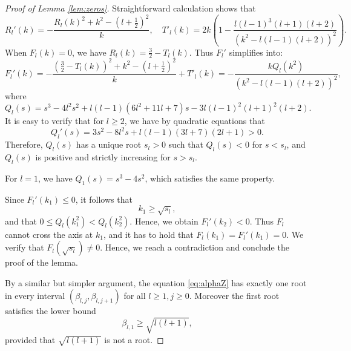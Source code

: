 \documentclass[10pt,a4paper]{amsart}
\begin{document}
\begin{proof}[Proof of Lemma \ref{lem:zeros}]
  Straightforward calculation shows that
  \[ R_l' (k) = - \frac{R_l (k)^2 + k^2 - \left( l + \frac{1}{2}
     \right)^2}{k}, \quad T'_l (k) = 2 k \left( 1 - \frac{l (l - 1)^3 (l + 1)
     (l + 2)}{(k^2 - l (l - 1) (l + 2))^2} \right) . \]
  When $F_l (k) = 0$, we have $R_l (k) = \frac{3}{2} - T_l (k)$. Thus $F_l'$
  simplifies into:
  \[ F_l' (k) = - \frac{\left( \frac{3}{2} - T_l (k) \right)^2 + k^2 - \left(
     l + \frac{1}{2} \right)^2}{k} + T'_l (k) = - \frac{kQ_l (k^2)}{(k^2 - l
     (l - 1) (l + 2))^2}, \]
  where
  \[ Q_l (s) = s^3 - 4 l^2 s^2 + l (l - 1)  (6 l^2 + 11 l + 7) s - 3 l (l -
     1)^2  (l + 1)^2  (l + 2) . \]
  It is easy to verify that for $l \geqslant 2$, we have by quadratic
  equations that
  \[ Q_l' (s) = 3 s^2 - 8 l^2 s + l (l - 1)  (3 l + 7)  (2 l + 1) > 0. \]
  Therefore, $Q_l (s)$ has a unique root $s_l > 0$ such that $Q_l (s) < 0$ for
  $s < s_l$, and $Q_l (s)$ is positive and strictly increasing for $s > s_l$.
  
  For $l = 1$, we have $Q_1 (s) = s^3 - 4 s^2$, which satisfies the same
  property.
  
  Since $F_l' (k_1) \leqslant 0$, it follows that
  \[ k_1 \geqslant \sqrt{s_l}, \]
  and that $0 \leqslant Q_l (k_1^2) < Q_l (k_2^2)$. Hence, we obtain $F_l'
  (k_2) < 0$. Thus $F_l$ cannot cross the axis at $k_1$, and it has to hold
  that $F_l (k_1) = F_l' (k_1) = 0$. We verify that $F_l (\sqrt{s_l}) \neq 0$.
  Hence, we reach a contradiction and conclude the proof of the lemma.
  
  By a similar but simpler argument, the equation \eqref{eq:alphaZ} has
  exactly one root in every interval $(\beta_{l, j}, \beta_{l, j + 1})$ for
  all $l \geqslant 1, j \geqslant 0$. Moreover the first root satisfies the
  lower bound
  \[ \beta_{l, 1} \geqslant \sqrt{l (l + 1)}, \]
  provided that $\sqrt{l (l + 1)}$ is not a root.
\end{proof}
\end{document}
